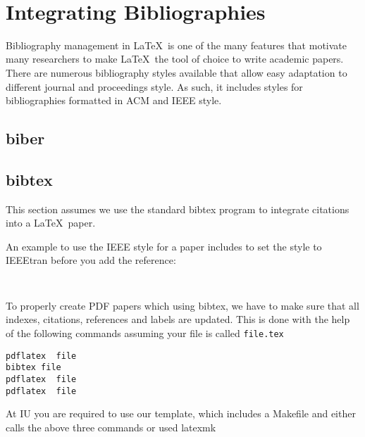 
\FILENAME\

\section{Integrating Bibliographies}
\label{S:bibliographies}

Bibliography management in \LaTeX\ is one of the many features that
motivate many researchers to make \LaTeX\ the tool of choice to write
academic papers. There are numerous bibliography styles available that
allow easy adaptation to different journal and proceedings style. As
such, it includes styles for bibliographies formatted in ACM and IEEE
style.

\subsection{biber}


\subsection{bibtex}

This section assumes we use the standard bibtex program to integrate
citations into a \LaTeX\ paper.

An example to use the IEEE style for a paper includes to set
the style to IEEEtran before you add the reference:

\begin{verbatim}


\end{verbatim}

To properly create PDF papers which using bibtex, we have to make sure
that all indexes, citations, references and labels are updated. This
is done with the help of the following commands assuming your file is
called \verb|file.tex|

\begin{verbatim}
pdflatex  file
bibtex file
pdflatex  file
pdflatex  file
\end{verbatim}


\begin{IU}
At IU you are required to use our template, which includes a Makefile
and either calls the above three commands or used latexmk
\end{IU}

